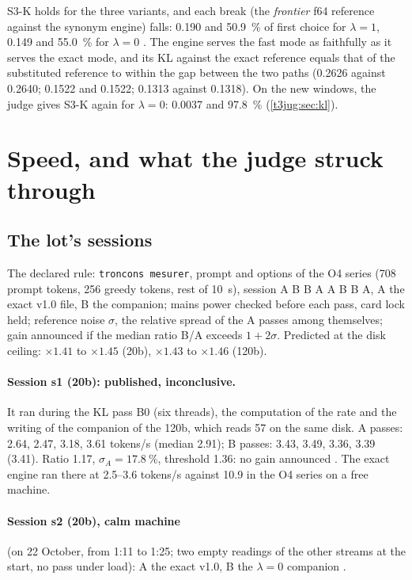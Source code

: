 S3-K holds for the three variants, and each break (the \emph{frontier} f64 reference against the synonym engine) falls: \num{0.190} and \SI{50.9}{\percent} of first choice for $\lambda = 1$, \num{0.149} and \SI{55.0}{\percent} for $\lambda = 0$ \mes. The engine serves the fast mode as faithfully as it serves the exact mode, and its KL against the exact reference equals that of the substituted reference to within the gap between the two paths (\num{0.2626} against \num{0.2640}; \num{0.1522} and \num{0.1522}; \num{0.1313} against \num{0.1318}). On the new windows, the judge gives S3-K again for $\lambda = 0$: \num{0.0037} and \SI{97.8}{\percent} (\cref{t3jug:sec:kl}).

\section{Speed, and what the judge struck through}\label{t3sno:sec:vitesse}

\subsection{The lot's sessions}\label{t3sno:sec:seances}

The declared rule: \texttt{troncons mesurer}, prompt and options of the O4 series (708 prompt tokens, 256 greedy tokens, rest of \SI{10}{\second}), session A B B A A B B A, A the exact v1.0 file, B the companion; mains power checked before each pass, card lock held; reference noise $\sigma$, the relative spread of the A passes among themselves; gain announced if the median ratio B/A exceeds $1 + 2\sigma$. Predicted at the disk ceiling: $\times 1.41$ to $\times 1.45$ (20b), $\times 1.43$ to $\times 1.46$ (120b).

\paragraph{Session s1 (20b): published, inconclusive.} It ran during the KL pass B0 (six threads), the computation of the rate and the writing of the companion of the 120b, which reads \SI{57}{\Go} on the same disk. A passes: \num{2.64}, \num{2.47}, \num{3.18}, \num{3.61} tokens/s (median \num{2.91}); B passes: \num{3.43}, \num{3.49}, \num{3.36}, \num{3.39} (\num{3.41}). Ratio \num{1.17}, $\sigma_A = \SI{17.8}{\percent}$, threshold \num{1.36}: no gain announced \mes. The exact engine ran there at \numrange{2.5}{3.6} tokens/s against \num{10.9} in the O4 series on a free machine.

\paragraph{Session s2 (20b), calm machine} (on 22 October, from 1:11 to 1:25; two empty readings of the other streams at the start, no pass under load): A the exact v1.0, B the $\lambda = 0$ companion \mes.

